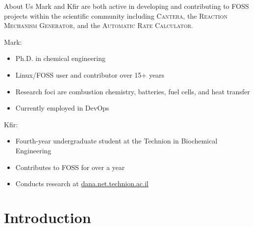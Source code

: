 \begin{frame}{About Us}
Mark and Kfir are both active in developing and contributing to FOSS projects within the scientific community including \textsc{Cantera}, the \textsc{Reaction Mechanism Generator}, and the \textsc{Automatic Rate Calculator}.

\vspace{0.5cm}

Mark:
\begin{itemize}
 \item Ph.D. in chemical engineering
 \item Linux/FOSS user and contributor over 15+ years
 \item Research foci are combustion chemistry, batteries, fuel cells, and heat transfer
 \item Currently employed in DevOps
\end{itemize}

\vspace{0.5cm}

Kfir:
\begin{itemize}
 \item Fourth-year undergraduate student at the Technion in Biochemical Engineering
 \item Contributes to FOSS for over a year
 \item Conducts research at \url{dana.net.technion.ac.il}
\end{itemize}

\end{frame}

\section{Introduction}


